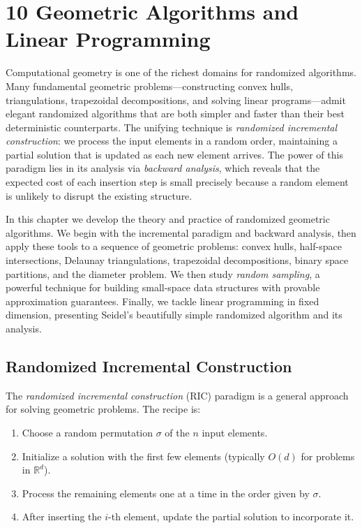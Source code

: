 \documentclass[twoside,12pt]{book}
\theoremstyle{plain}
\theoremstyle{definition}
\theoremstyle{remark}
\begin{document}
\chapter*{10 Geometric Algorithms and Linear Programming}
\label{ch:geometric}

Computational geometry is one of the richest domains for randomized algorithms. Many fundamental geometric problems---constructing convex hulls, triangulations, trapezoidal decompositions, and solving linear programs---admit elegant randomized algorithms that are both simpler and faster than their best deterministic counterparts. The unifying technique is \emph{randomized incremental construction}: we process the input elements in a random order, maintaining a partial solution that is updated as each new element arrives. The power of this paradigm lies in its analysis via \emph{backward analysis}, which reveals that the expected cost of each insertion step is small precisely because a random element is unlikely to disrupt the existing structure.

In this chapter we develop the theory and practice of randomized geometric algorithms. We begin with the incremental paradigm and backward analysis, then apply these tools to a sequence of geometric problems: convex hulls, half-space intersections, Delaunay triangulations, trapezoidal decompositions, binary space partitions, and the diameter problem. We then study \emph{random sampling}, a powerful technique for building small-space data structures with provable approximation guarantees. Finally, we tackle linear programming in fixed dimension, presenting Seidel's beautifully simple randomized algorithm and its analysis.

\section{Randomized Incremental Construction}
\label{sec:ric}

The \emph{randomized incremental construction} (RIC) paradigm is a general approach for solving geometric problems. The recipe is:

\begin{enumerate}[nosep]
    \item Choose a random permutation $\sigma$ of the $n$ input elements.
    \item Initialize a solution with the first few elements (typically $O(d)$ for problems in $\mathbb{R}^d$).
    \item Process the remaining elements one at a time in the order given by $\sigma$.
    \item After inserting the $i$-th element, update the partial solution to incorporate it.
\end{enumerate}
\end{document}
